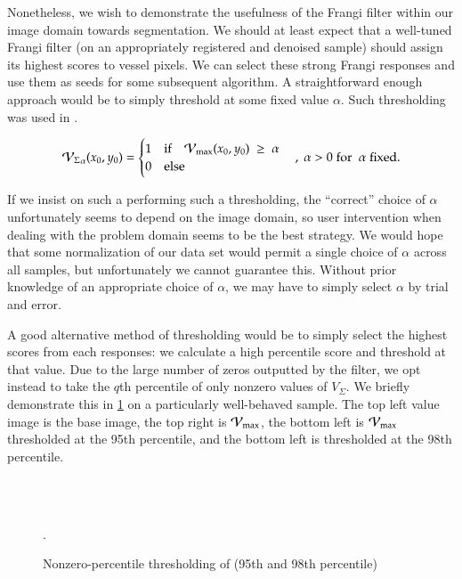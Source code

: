     Nonetheless, we wish to demonstrate the usefulness of the Frangi filter within our image domain towards segmentation. We should at least expect that a well-tuned Frangi filter (on an appropriately registered and denoised sample) should assign its highest scores to vessel pixels. We can select these strong Frangi responses and use them as seeds for some subsequent algorithm. A straightforward enough approach would be to simply threshold at some fixed value $\alpha$. Such thresholding was used in \cite{huynh2013filter}. 
   

   \begin{equation}	    
      {\ensuremath{\mathcal{V}_{\Sigma}}}_{\alpha}(x_0,y_0) = \begin{cases}
   1 & \textrm{if}\quad \mathcal{V}_{\max}(x_0,y_0) \; \ge\;  \alpha \\
   0 & \textrm{else}
  \end{cases}
   \quad , \; \alpha > 0
   \; \textrm{for } \; \alpha \;\textrm{fixed}.
   \end{equation}
 

If we insist on such a performing such a thresholding, the ``correct'' choice of $\alpha$ unfortunately seems to depend on the image domain, so user intervention when dealing with the problem domain seems to be the best strategy. We would hope that some normalization of our data set would permit a single choice of $\alpha$ across all samples, but unfortunately we cannot guarantee this. Without prior knowledge of an appropriate choice of $\alpha$, we may have to simply select $\alpha$ by trial and error.


A good alternative method of thresholding would be to simply select the highest scores from each responses: we calculate a high percentile score and threshold at that value. Due to the large number of zeros outputted by the filter, we opt instead to take the $q$th percentile of only nonzero values of $V_\Sigma$. 
We briefly demonstrate this in \cref{fig:qthresh_demo} on a particularly well-behaved sample. The top left value image is the base image, the top right is $\mathcal{V}_{\max}$, the bottom left is $\mathcal{V}_{\max}$ thresholded at the 95th percentile, and the bottom left is thresholded at the 98th percentile.

\begin{figure} \centering
{}
 \\
 \\
\caption{Nonzero-percentile thresholding of \Vmax (95th and 98th percentile)}.
\label{fig:qthresh_demo}
\end{figure}

